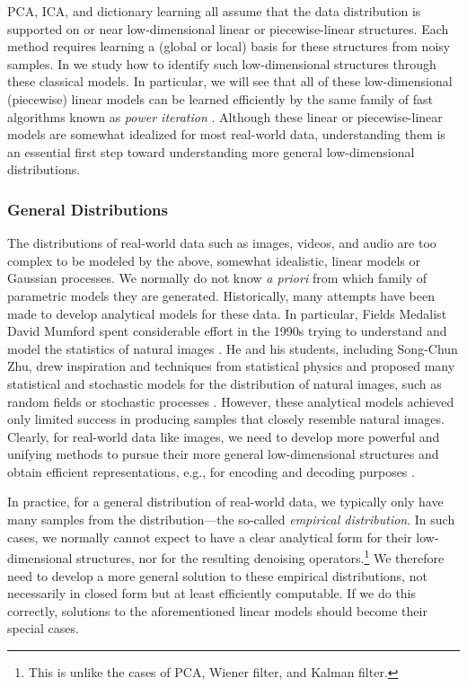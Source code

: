 \documentclass[../../book-main.tex]{subfiles}
\begin{document}
PCA, ICA, and dictionary learning all assume that the data
distribution is supported on or near low-dimensional linear or
piecewise-linear structures. Each method requires learning a (global
or local) basis for these structures from noisy samples. In
 we study how to identify such low-dimensional
structures through these classical models. In particular, we will see
that all of these low-dimensional (piecewise) linear models can be
learned efficiently by the same family of fast algorithms known as
\textit{power iteration} \cite{Zhai-2020}. Although these linear or
piecewise-linear models are somewhat idealized for most real-world
data, understanding them is an essential first step toward
understanding more general low-dimensional distributions.

\subsubsection{General Distributions}\label{sec:denoising-intro}

The distributions of real-world data such as images, videos, and
audio are too complex to be modeled by the above, somewhat
idealistic, linear models or Gaussian processes. We normally do not
know \textit{a priori} from which family of parametric models they
are generated. Historically, many attempts have been made to develop
analytical models for these data. In particular, Fields Medalist
David Mumford spent considerable effort in the 1990s trying to
understand and model the statistics of natural images
\cite{Mumford1996TheSD}. He and his students, including Song-Chun
Zhu, drew inspiration and techniques from statistical physics and
proposed many statistical and stochastic models for the distribution
of natural images, such as random fields or stochastic processes
\cite{Zhu-Entropy-1997,Zhu1997LearningGP,Zhu1997Prior,Huang-Mumford,Mumford-1999,Lee-Mumford}.
However, these analytical models achieved only limited success in
producing samples that closely resemble natural images. Clearly, for
real-world data like images, we need to develop more powerful and
unifying methods to pursue their more general low-dimensional structures and obtain
 efficient representations, e.g., 
for encoding and decoding purposes \cite{ALLARD2012435,LITTLE2017504}.

In practice, for a general distribution of real-world data, we
typically only have many samples from the distribution---the
so-called \textit{empirical distribution}. In such cases, we normally
cannot expect to have a clear analytical form for their
low-dimensional structures, nor for the resulting denoising
operators.\footnote{This is unlike the cases of PCA, Wiener filter,
and Kalman filter.} We therefore need to develop a more general
solution to these empirical distributions, not necessarily in closed
form but at least efficiently computable. If we do this correctly,
solutions to the aforementioned linear models should become their special cases.
\end{document}
